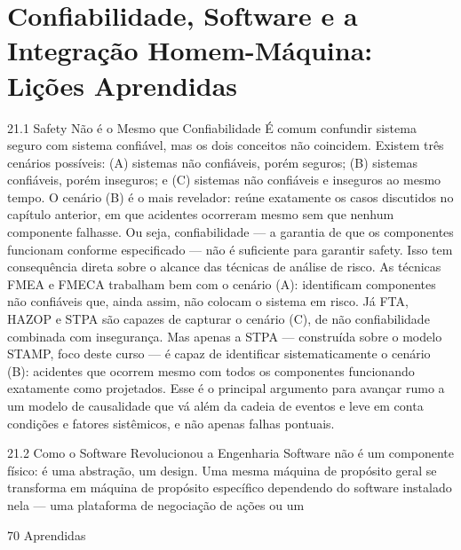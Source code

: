 \chapter{Confiabilidade, Software e a Integração Homem-Máquina: Lições Aprendidas}

21.1 Safety Não é o Mesmo que Confiabilidade É comum confundir sistema seguro com sistema confiável, mas os dois conceitos não coincidem. Existem três cenários possíveis: (A) sistemas não confiáveis, porém seguros; (B) sistemas confiáveis, porém inseguros; e (C) sistemas não confiáveis e inseguros ao mesmo tempo. O cenário (B) é o mais revelador: reúne exatamente os casos discutidos no capítulo anterior, em que acidentes ocorreram mesmo sem que nenhum componente falhasse. Ou seja, confiabilidade — a garantia de que os componentes funcionam conforme especificado — não é suficiente para garantir safety. Isso tem consequência direta sobre o alcance das técnicas de análise de risco. As técnicas FMEA e FMECA trabalham bem com o cenário (A): identificam componentes não confiáveis que, ainda assim, não colocam o sistema em risco. Já FTA, HAZOP e STPA são capazes de capturar o cenário (C), de não confiabilidade combinada com insegurança. Mas apenas a STPA — construída sobre o modelo STAMP, foco deste curso — é capaz de identificar sistematicamente o cenário (B): acidentes que ocorrem mesmo com todos os componentes funcionando exatamente como projetados. Esse é o principal argumento para avançar rumo a um modelo de causalidade que vá além da cadeia de eventos e leve em conta condições e fatores sistêmicos, e não apenas falhas pontuais.

21.2 Como o Software Revolucionou a Engenharia Software não é um componente físico: é uma abstração, um design. Uma mesma máquina de propósito geral se transforma em máquina de propósito específico dependendo do software instalado nela — uma plataforma de negociação de ações ou um

70 Aprendidas

